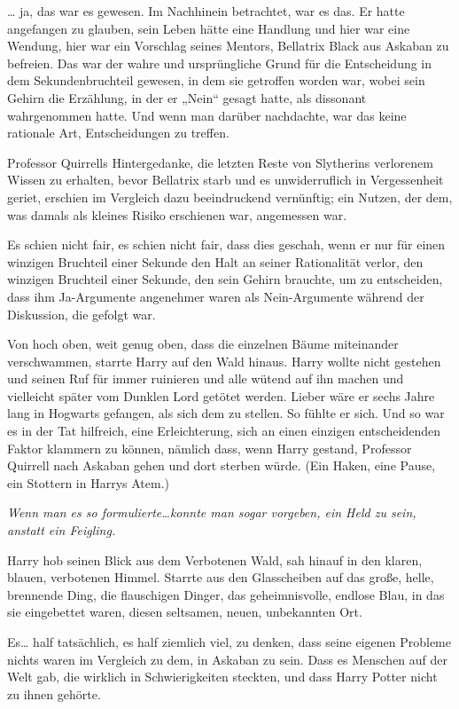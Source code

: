 {… ja, das war es gewesen. Im Nachhinein betrachtet, war es das. Er hatte angefangen zu glauben, sein Leben hätte eine Handlung und hier war eine Wendung, hier war ein Vorschlag seines Mentors, Bellatrix Black aus Askaban zu befreien. Das war der wahre und ursprüngliche Grund für die Entscheidung in dem Sekundenbruchteil gewesen, in dem sie getroffen worden war, wobei sein Gehirn die Erzählung, in der er „Nein“ gesagt hatte, als dissonant wahrgenommen hatte. Und wenn man darüber nachdachte, war das keine rationale Art, Entscheidungen zu treffen.

Professor Quirrells Hintergedanke, die letzten Reste von Slytherins verlorenem Wissen zu erhalten, bevor Bellatrix starb und es unwiderruflich in Vergessenheit geriet, erschien im Vergleich dazu beeindruckend vernünftig; ein Nutzen, der dem, was damals als kleines Risiko erschienen war, angemessen war.

Es schien nicht fair, es schien nicht fair, dass dies geschah, wenn er nur für einen winzigen Bruchteil einer Sekunde den Halt an seiner Rationalität verlor, den winzigen Bruchteil einer Sekunde, den sein Gehirn brauchte, um zu entscheiden, dass ihm Ja-Argumente angenehmer waren als Nein-Argumente während der Diskussion, die gefolgt war.

Von hoch oben, weit genug oben, dass die einzelnen Bäume miteinander verschwammen, starrte Harry auf den Wald hinaus. Harry wollte nicht gestehen und seinen Ruf für immer ruinieren und alle wütend auf ihn machen und vielleicht später vom Dunklen Lord getötet werden. Lieber wäre er sechs Jahre lang in Hogwarts gefangen, als sich dem zu stellen. So fühlte er sich. Und so war es in der Tat hilfreich, eine Erleichterung, sich an einen einzigen entscheidenden Faktor klammern zu können, nämlich dass, wenn Harry gestand, Professor Quirrell nach Askaban gehen und dort sterben würde. (Ein Haken, eine Pause, ein Stottern in Harrys Atem.)

\emph{Wenn man es so formulierte…konnte man sogar vorgeben, ein Held zu sein, anstatt ein Feigling.}

Harry hob seinen Blick aus dem Verbotenen Wald, sah hinauf in den klaren, blauen, verbotenen Himmel. Starrte aus den Glasscheiben auf das große, helle, brennende Ding, die flauschigen Dinger, das geheimnisvolle, endlose Blau, in das sie eingebettet waren, diesen seltsamen, neuen, unbekannten Ort.

Es… half tatsächlich, es half ziemlich viel, zu denken, dass seine eigenen Probleme nichts waren im Vergleich zu dem, in Askaban zu sein. Dass es Menschen auf der Welt gab, die wirklich in Schwierigkeiten steckten, und dass Harry Potter nicht zu ihnen gehörte.

}
